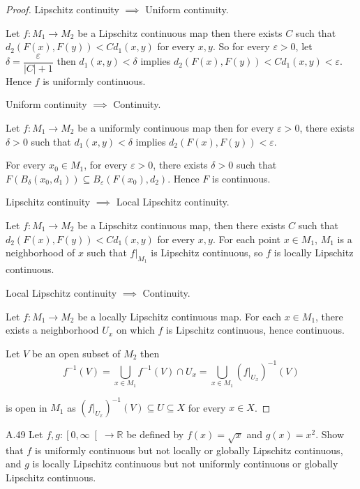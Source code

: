 \begin{proof}
    Lipschitz continuity \( \implies \) Uniform continuity.

    Let \( f: M_{1} \to M_{2} \) be a Lipschitz continuous map then there exists \( C \) such that \( d_{2}(F(x), F(y)) < C d_{1}(x, y) \) for every \( x, y \). So for every \( \varepsilon > 0 \), let \( \delta = \dfrac{\varepsilon}{\left\vert C \right\vert + 1} \) then \( d_{1}(x, y) < \delta \) implies \( d_{2}(F(x), F(y)) < C d_{1}(x, y) < \varepsilon \). Hence \( f \) is uniformly continuous.

    Uniform continuity \( \implies \) Continuity.

    Let \( f: M_{1} \to M_{2} \) be a uniformly continuous map then for every \( \varepsilon > 0 \), there exists \( \delta > 0 \) such that \( d_{1}(x, y) < \delta \) implies \( d_{2}(F(x), F(y)) < \varepsilon \).

    For every \( x_{0} \in M_{1} \), for every \( \varepsilon > 0 \), there exists \( \delta > 0 \) such that \( F(B_{\delta}(x_{0}, d_{1})) \subseteq B_{\varepsilon}(F(x_{0}), d_{2}) \). Hence \( F \) is continuous.

    Lipschitz continuity \( \implies \) Local Lipschitz continuity.

    Let \( f: M_{1} \to M_{2} \) be a Lipschitz continuous map, then there exists \( C \) such that \( d_{2}(F(x), F(y)) < C d_{1}(x, y) \) for every \( x, y \). For each point \( x \in M_{1} \), \( M_{1} \) is a neighborhood of \( x \) such that \( f\vert_{M_{1}} \) is Lipschitz continuous, so \( f \) is locally Lipschitz continuous.

    Local Lipschitz continuity \( \implies \) Continuity.

    Let \( f: M_{1} \to M_{2} \) be a locally Lipschitz continuous map. For each \( x \in M_{1} \), there exists a neighborhood \( U_{x} \) on which \( f \) is Lipschitz continuous, hence continuous.

    Let \( V \) be an open subset of \( M_{2} \) then
    \[
        f^{-1}(V) = \bigcup_{x \in M_{1}} f^{-1}(V) \cap U_{x} = \bigcup_{x \in M_{1}} {(f\vert_{U_{x}})}^{-1}(V)
    \]

    is open in \( M_{1} \) as \( {(f\vert_{U_{x}})}^{-1}(V) \subseteq U \subseteq X \) for every \( x \in X \).
\end{proof}

\begin{exercise}{A.49}
    Let \( f, g: \left\lbrack 0, \infty \right\lbrack \to \mathbb{R} \) be defined by \( f(x) = \sqrt{x} \) and \( g(x) = x^{2} \). Show that \( f \) is uniformly continuous but not locally or globally Lipschitz continuous, and \( g \) is locally Lipschitz continuous but not uniformly continuous or globally Lipschitz continuous.
\end{exercise}

